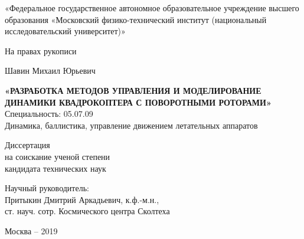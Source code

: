 \thispagestyle{empty}
\begin{comment} 
«Федеральное государственное бюджетное образовательное\\
учреждение высшего образования \\
«Московский авиационный институт \\
(национальный исследовательский университет)»
\end{comment}

\begin{center} 
«Федеральное государственное автономное образовательное учреждение высшего образования «Московский физико-технический институт (национальный исследовательский университет)»
\end{center}

{
\vskip 5mm
}

\begin{flushright}
На правах рукописи
\end{flushright}


{
   	\vskip 12mm
}

\begin{center}
	Шавин Михаил Юрьевич
\end{center}
\begin{center} 
	\textbf{«РАЗРАБОТКА МЕТОДОВ УПРАВЛЕНИЯ И МОДЕЛИРОВАНИЕ ДИНАМИКИ КВАДРОКОПТЕРА С ПОВОРОТНЫМИ РОТОРАМИ»} \\
	Специальность: 05.07.09 \\
	Динамика, баллистика, управление движением летательных аппаратов
\end{center}

{
	\vskip 6mm
}

\begin{center} 
	Диссертация \\
	на соискание ученой степени \\
	кандидата технических наук
\end{center}


{
	\vskip 12mm
}

\begin{flushright}
Научный руководитель: \hspace{46mm} \phantom{} \\
Притыкин Дмитрий Аркадьевич, к.ф.-м.н.,  \hspace{3mm} \phantom{}\\
ст. науч. сотр. Космического центра Сколтеха \\
\vspace{5mm}
\end{flushright}

{
	\vskip 8mm
}

\begin{center} 
Москва -- 2019
\end{center}
